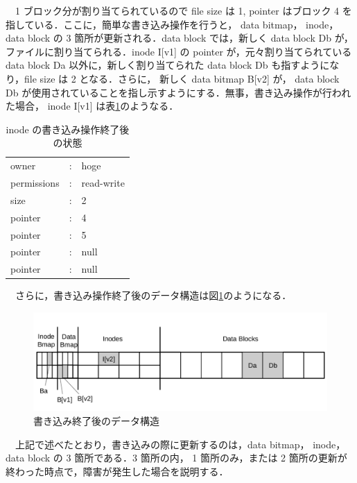 \documentclass[graduation-thesis]{jsarticle}
\begin{document}
　1 ブロック分が割り当てられているので file size は 1, pointer はブロック 4 を指している．ここに，簡単な書き込み操作を行うと， data bitmap， inode， data block の 3 箇所が更新される．data block では，新しく data block Db が，ファイルに割り当てられる．inode I[v1] の pointer が，元々割り当てられている data block Da 以外に，新しく割り当てられた data block Db も指すようになり，file size は 2 となる．さらに， 新しく data bitmap B[v2] が， data block Db が使用されていることを指し示すようにする．無事，書き込み操作が行われた場合， inode I[v1] は表\ref{tab:inode2}のようなる．\\
\begin{table}[h]
	\begin{center}
	\caption{inode の書き込み操作終了後の状態}
		\begin{tabular}{lcl}
			owner & : & hoge \\
			permissions & : & read-write \\
			size & : & 2 \\
			pointer & : & 4 \\
			pointer & : & 5 \\
			pointer & : & null \\
			pointer & : & null
		\end{tabular}
		\label{tab:inode2}
	\end{center}
\end{table}
　さらに，書き込み操作終了後のデータ構造は図\ref{fig:data2}のようになる．\\
\begin{figure}[H]
	\begin{center}
		\includegraphics[width=15.0cm,clip]{images/data2.pdf}
		\caption{書き込み終了後のデータ構造}
		\label{fig:data2}
	\end{center}
\end{figure}
　上記で述べたとおり，書き込みの際に更新するのは，data bitmap， inode， data block の 3 箇所である．3 箇所の内， 1 箇所のみ，または 2 箇所の更新が終わった時点で，障害が発生した場合を説明する．
\end{document}
